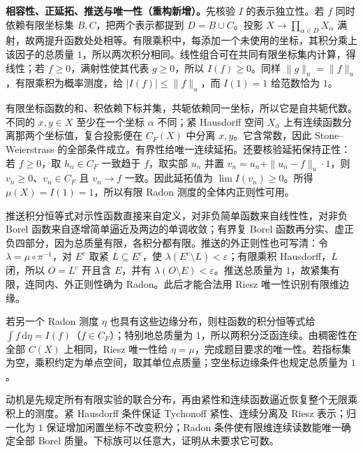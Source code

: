 \documentclass[../../main.tex]{subfiles}
\begin{document}
\begin{remark}
\textbf{相容性、正延拓、推送与唯一性（重构新增）。}先核验 $I$ 的表示独立性。若 $f$ 同时依赖有限坐标集 $B,C$，把两个表示都提到 $D=B\cup C$。投影 $X\to\prod_{\alpha\in D}X_\alpha$ 满射，故两提升函数处处相等。有限乘积中，每添加一个未使用的坐标，其积分乘上该因子的总质量 $1$，所以两次积分相同。线性组合可在共同有限坐标集内计算，得线性；若 $f\geqslant0$，满射性使其代表 $g\geqslant0$，所以 $I(f)\geqslant0$。同样 $\|g\|_u=\|f\|_u$，有限乘积为概率测度，给 $|I(f)|\leqslant\|f\|_u$，而 $I(1)=1$ 给范数恰为 $1$。

有限坐标函数的和、积依赖下标并集，共轭依赖同一坐标，所以它是自共轭代数。不同的 $x,y\in X$ 至少在一个坐标 $\alpha$ 不同；紧 Hausdorff 空间 $X_\alpha$ 上有连续函数分离那两个坐标值，复合投影便在 $C_F(X)$ 中分离 $x,y$。它含常数，因此 Stone--Weierstrass 的全部条件成立。有界性给唯一连续延拓。还要核验延拓保持正性：若 $f\geqslant0$，取 $h_n\in C_F$ 一致趋于 $f$，取实部 $u_n$ 并置 $v_n=u_n+\|u_n-f\|_u\cdot1$，则 $v_n\geqslant0$、$v_n\in C_F$ 且 $v_n\to f$ 一致。因此延拓值为 $\lim I(v_n)\geqslant0$。所得 $\mu(X)=I(1)=1$，所以有限 Radon 测度的全体内正则性可用。

推送积分恒等式对示性函数直接来自定义，对非负简单函数来自线性性，对非负 Borel 函数来自逐增简单逼近及两边的单调收敛；有界复 Borel 函数再分实、虚正负四部分，因为总质量有限，各积分都有限。推送的外正则性也可写清：令 $\lambda=\mu\circ\pi^{-1}$，对 $E^c$ 取紧 $L\subseteq E^c$，使 $\lambda(E^c\setminus L)<\varepsilon$；有限乘积 Hausdorff，$L$ 闭，所以 $O=L^c$ 开且含 $E$，并有 $\lambda(O\setminus E)<\varepsilon$。推送总质量为 $1$，故紧集有限，连同内、外正则性确为 Radon。此后才能合法用 Riesz 唯一性识别有限维边缘。

若另一个 Radon 测度 $\eta$ 也具有这些边缘分布，则柱函数的积分恒等式给 $\int f\,\mathrm d\eta=I(f)$（$f\in C_F$）；特别地总质量为 $1$，所以两积分泛函连续。由稠密性在全部 $C(X)$ 上相同，Riesz 唯一性给 $\eta=\mu$，完成题目要求的唯一性。若指标集为空，乘积约定为单点空间，取其单位点质量；空坐标边缘条件也规定总质量为 $1$。

动机是先规定所有有限实验的联合分布，再由紧性和连续函数逼近恢复整个无限乘积上的测度。紧 Hausdorff 条件保证 Tychonoff 紧性、连续分离及 Riesz 表示；归一化为 $1$ 保证增加闲置坐标不改变积分；Radon 条件使有限维连续读数能唯一确定全部 Borel 质量。下标族可以任意大，证明从未要求它可数。
\end{remark}

\end{document}
